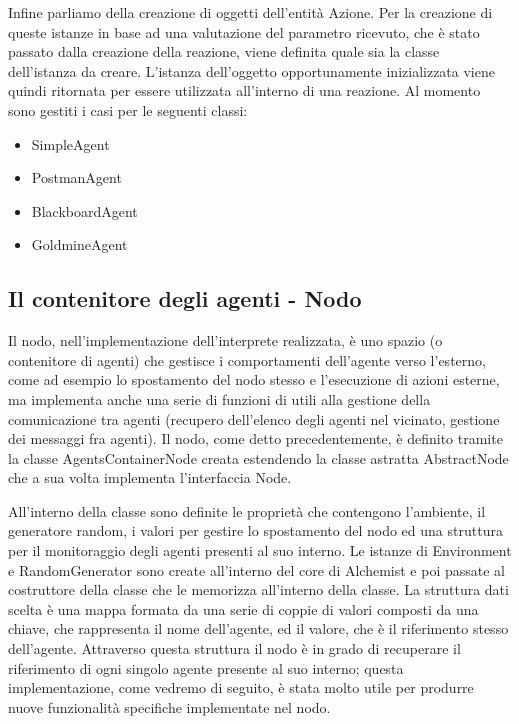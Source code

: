 Infine parliamo della creazione di oggetti dell'entità Azione. Per la creazione di queste istanze in base ad una valutazione del parametro ricevuto, che è stato passato dalla creazione della reazione, viene definita quale sia la classe dell'istanza da creare.
L'istanza dell'oggetto opportunamente inizializzata viene quindi ritornata per essere utilizzata all'interno di una reazione.
Al momento sono gestiti i casi per le seguenti classi:
\begin{itemize}
\item SimpleAgent
\item PostmanAgent
\item BlackboardAgent
\item GoldmineAgent
\end{itemize}


\subsection{Il contenitore degli agenti - Nodo}\label{sctn:AgentsContainerNode}
Il nodo, nell'implementazione dell'interprete realizzata, è uno spazio (o contenitore di agenti) che gestisce i comportamenti dell'agente verso l'esterno, come ad esempio lo spostamento del nodo stesso e l'esecuzione di azioni esterne, ma implementa anche una serie di funzioni di utili alla gestione della comunicazione tra agenti (recupero dell'elenco degli agenti nel vicinato, gestione dei messaggi fra agenti). Il nodo, come detto precedentemente, è definito tramite la classe AgentsContainerNode creata estendendo la classe astratta AbstractNode che a sua volta implementa l'interfaccia Node.

All'interno della classe sono definite le proprietà che contengono l'ambiente, il generatore random, i valori per gestire lo spostamento del nodo ed una struttura per il monitoraggio degli agenti presenti al suo interno.
Le istanze di Environment e RandomGenerator sono create all'interno del core di Alchemist e poi passate al costruttore della classe che le memorizza all'interno della classe. %
La struttura dati scelta è una mappa formata da una serie di coppie di valori composti da una chiave, che rappresenta il nome dell'agente, ed il valore, che è il riferimento stesso dell'agente. Attraverso questa struttura il nodo è in grado di recuperare il riferimento di ogni singolo agente presente al suo interno; questa implementazione, come vedremo di seguito, è stata molto utile per produrre nuove funzionalità specifiche implementate nel nodo.

